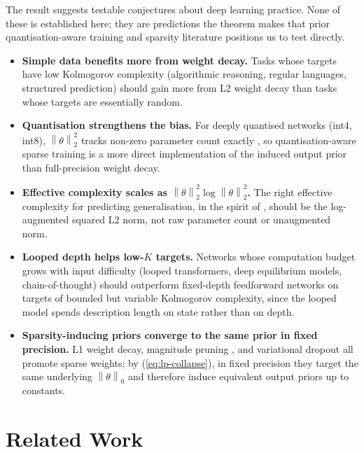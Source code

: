 \documentclass{article}
\theoremstyle{definition}
\newcommand{\norm}[1]{\left\lVert#1\right\rVert}
\begin{document}
The result suggests testable conjectures about deep learning practice. None of
these is established here; they are predictions the theorem makes that prior
quantisation-aware training and sparsity literature
\citep{hubara2017quantized,han2016deep,hoefler2021sparsity,molchanov2017variational}
positions us to test directly.

\begin{itemize}
  \item \textbf{Simple data benefits more from weight decay.} Tasks whose targets have low Kolmogorov complexity (algorithmic reasoning, regular languages, structured prediction) should gain more from L2 weight decay than tasks whose targets are essentially random.
  \item \textbf{Quantisation strengthens the bias.} For deeply quantised networks (int4, int8), $\norm{\theta}_2^2$ tracks non-zero parameter count exactly \citep{hubara2017quantized,han2016deep}, so quantisation-aware sparse training is a more direct implementation of the induced output prior than full-precision weight decay.
  \item \textbf{Effective complexity scales as $\norm{\theta}_2^2 \log \norm{\theta}_2^2$.} The right effective complexity for predicting generalisation, in the spirit of \citet{arora2018stronger}, should be the log-augmented squared L2 norm, not raw parameter count or unaugmented norm.
  \item \textbf{Looped depth helps low-$K$ targets.} Networks whose computation budget grows with input difficulty (looped transformers, deep equilibrium models, chain-of-thought) should outperform fixed-depth feedforward networks on targets of bounded but variable Kolmogorov complexity, since the looped model spends description length on state rather than on depth.
  \item \textbf{Sparsity-inducing priors converge to the same prior in fixed precision.} L1 weight decay, magnitude pruning \citep{han2016deep}, and variational dropout \citep{molchanov2017variational} all promote sparse weights; by (\ref{eq:lp-collapse}), in fixed precision they target the same underlying $\norm{\theta}_0$ and therefore induce equivalent output priors up to constants.
\end{itemize}

\section{Related Work}\label{sec:related}
\end{document}
